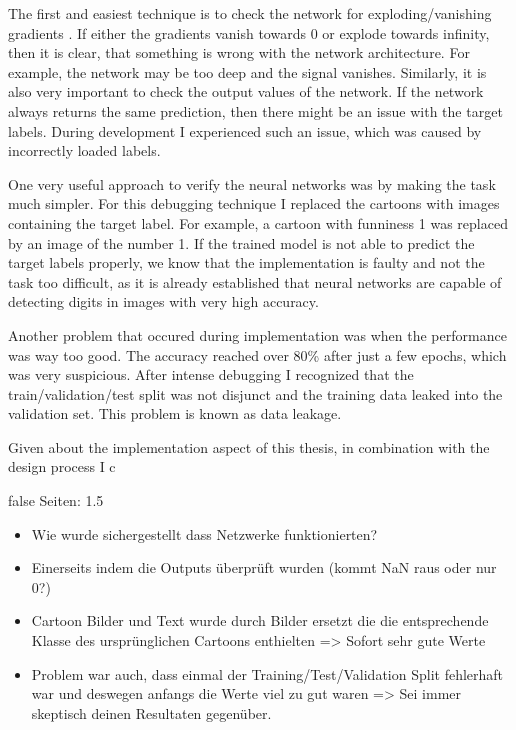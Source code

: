 \documentclass[draft,final,oneside]{vutinfth} %
\begin{document}
The first and easiest technique is to check the network for exploding/vanishing gradients \cite{vanishinggradient}. If either the gradients vanish towards 0 or explode towards infinity, then it is clear, that something is wrong with the network architecture. For example, the network may be too deep and the signal vanishes. Similarly, it is also very important to check the output values of the network. If the network always returns the same prediction, then there might be an issue with the target labels. During development I experienced such an issue, which was caused by incorrectly loaded labels.

One very useful approach to verify the neural networks was by making the task much simpler. For this debugging technique I replaced the cartoons with images containing the target label. For example, a cartoon with funniness 1 was replaced by an image of the number 1. If the trained model is not able to  predict the target labels properly, we know that the implementation is faulty and not the task too difficult, as it is already established that neural networks are capable of detecting digits in images with very high accuracy.

Another problem that occured during implementation was when the performance was way too good. The accuracy reached over 80\% after just a few epochs, which was very suspicious. After intense debugging I recognized that the train/validation/test split was not disjunct and the training data leaked into the validation set. This problem is known as data leakage.

Given  about the implementation aspect of this thesis, in combination with the design process I c

\if false
Seiten: 1.5

\begin{itemize}
\item Wie wurde sichergestellt dass Netzwerke funktionierten? 
\item Einerseits indem die Outputs überprüft wurden (kommt NaN raus oder nur 0?)
\item Cartoon Bilder und Text wurde durch Bilder ersetzt die die entsprechende Klasse des ursprünglichen Cartoons enthielten => Sofort sehr gute Werte
\item Problem war auch, dass einmal der Training/Test/Validation Split fehlerhaft war und deswegen anfangs die Werte viel zu gut waren => Sei immer skeptisch deinen Resultaten gegenüber.
\end{itemize}
\fi
\end{document}
